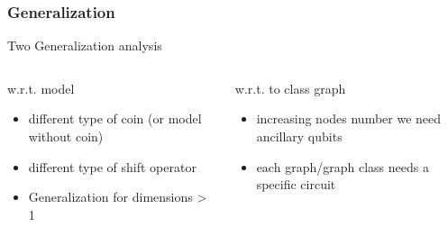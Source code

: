 \documentclass{beamer}
\begin{document}
\begin{frame}
    \frametitle{Generalization}
    Two Generalization analysis
    \begin{columns}[T]
        \begin{column}{.5\textwidth}
            \begin{block}{w.r.t. model}
                \begin{itemize}
                    \item different type of coin (or model without coin)
                    \item different type of shift operator
                    \item Generalization for dimensions > 1
                \end{itemize}
            \end{block}
        \end{column}
        \begin{column}{.5\textwidth}
            \begin{block}{w.r.t. to class graph}
                \begin{itemize}
                    \item increasing nodes number we need ancillary qubits
                    \item each graph/graph class needs a specific circuit 
                \end{itemize}
            \end{block}
        \end{column}
    \end{columns}
    
\end{frame}
\end{document}
